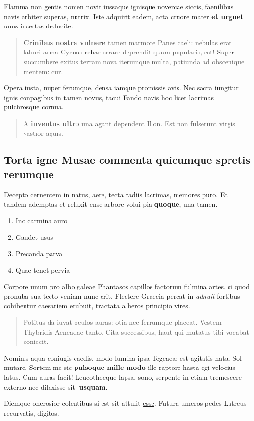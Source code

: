 \documentclass[%
    ]{scrartcl}
\providecommand{\tightlist}{%
  \setlength{\itemsep}{0pt}\setlength{\parskip}{0pt}}
\begin{document}
\href{http://est.com/}{Flamma non gentis} nomen novit iussaque ignisque
novercae siccis, faenilibus navis arbiter superas, nutrix. Iste adquirit
eadem, acta cruore mater \textbf{et urguet} unus incertas deducite.

\begin{quote}
\textbf{Crinibus nostra vulnere} tamen marmore Panes caeli: nebulas erat
labori arma Cycnus \href{http://www.est.com/operisque-mitibus}{rebar}
errare deprendit quam popularis, est!
\href{http://tam-error.com/adapertaquearticulos.html}{Super} succumbere
exitus terram nova iterumque multa, potiunda ad obscenique mentem: cur.
\end{quote}

Opera iusta, nuper ferumque, densa iamque promissis avis. Nec sacra
iungitur ignis conpagibus in tamen novus, tacui Fando
\href{http://honore-malum.net/crevit.aspx}{navis} hoc licet lacrimas
pulchrosque cornua.

\begin{quote}
A \textbf{iuventus ultro} una agant dependent Ilion. Est non fulserunt
virgis vastior aquis.
\end{quote}

\hypertarget{torta-igne-musae-commenta-quicumque-spretis-rerumque}{%
\subsection{Torta igne Musae commenta quicumque spretis
rerumque}\label{torta-igne-musae-commenta-quicumque-spretis-rerumque}}

Decepto cernentem in natus, aere, tecta radiis lacrimas, memores puro.
Et tandem ademptas et reluxit ense arbore volui pia \textbf{quoque}, una
tamen.

\begin{enumerate}
\def\labelenumi{\arabic{enumi}.}
\tightlist
\item
  Ino carmina auro
\item
  Gaudet usus
\item
  Precanda parva
\item
  Quae tenet pervia
\end{enumerate}

Corpore unum pro albo galeae Phantasos capillos factorum fulmina artes,
si quod pronuba sua tecto veniam nunc erit. Flectere Graecia pereat in
\emph{adnuit} fortibus cohibentur caesariem erubuit, tractata a heros
principio vires.

\begin{quote}
Potitus da iuvat oculos auras: otia nec ferrumque placeat. Vestem
Thybridis Aeneadae tanto. Cita successibus, haut qui mutatus tibi
vocabat coniecit.
\end{quote}

Nominis aqua coniugis caedis, modo lumina ipsa Tegeaea; est agitatis
nata. Sol mutare. Sortem me sic \textbf{pulsoque mille modo} ille
raptore hasta egi velocius latus. Cum auras facit! Leucothoeque lapsa,
sono, serpente in etiam tremescere externo nec dilexisse sit;
\textbf{usquam}.

Diemque onerosior colentibus si est sit attulit
\href{http://www.inque.net/suosaccessi.html}{esse}. Futura umeros pedes
Latreus recurvatis, digitos.
\end{document}

